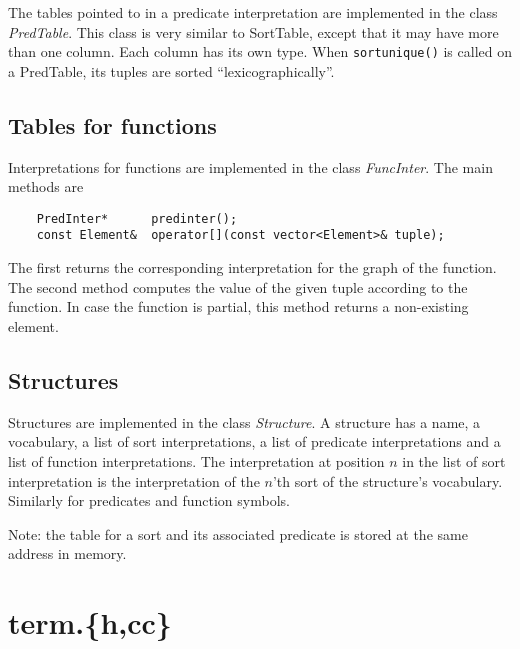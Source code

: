 \documentclass{article}
\begin{document}
The tables pointed to in a predicate interpretation are implemented in the class \emph{PredTable}. This class is very similar to SortTable, except that it may have more than one column. Each column has its own type. When \texttt{sortunique()} is called on a PredTable, its tuples are sorted ``lexicographically''. 

\subsection*{Tables for functions}

Interpretations for functions are implemented in the class \emph{FuncInter}. The main methods are
\begin{lstlisting}
	PredInter*      predinter();
	const Element&  operator[](const vector<Element>& tuple);
\end{lstlisting}
The first returns the corresponding interpretation for the graph of the function. The second method computes the value of the given tuple according to the function. In case the function is partial, this method returns a non-existing element. 

\subsection*{Structures}

Structures are implemented in the class \emph{Structure}. A structure has a name, a vocabulary, a list of sort interpretations, a list of predicate interpretations and a list of function interpretations. The interpretation at position $n$ in the list of sort interpretation is the interpretation of the $n$'th sort of the structure's vocabulary. Similarly for predicates and function symbols. 

Note: the table for a sort and its associated predicate is stored at the same address in memory. 

\section{term.\{h,cc\}}

\end{document}
